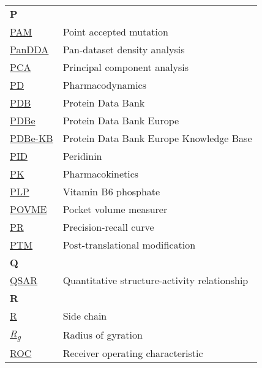 \begin{longtable}[l]{@{}p{2.5cm}p{12cm}@{}}
\textbf{\large P} & \\[0.25cm]
\textmd{\href{https://en.wikipedia.org/wiki/Point_accepted_mutation}{PAM}} & Point accepted mutation \\
\textmd{\href{https://www.nature.com/articles/ncomms15123}{PanDDA}} & Pan-dataset density analysis \\
\textmd{\href{https://en.wikipedia.org/wiki/Principal_component_analysis}{PCA}} & Principal component analysis \\
\textmd{\href{https://en.wikipedia.org/wiki/Pharmacodynamics}{PD}} & Pharmacodynamics \\ 
\textmd{\href{https://en.wikipedia.org/wiki/Protein_Data_Bank}{PDB}} & Protein Data Bank \\
\textmd{\href{https://www.ebi.ac.uk/pdbe/}{PDBe}} & Protein Data Bank Europe \\
\textmd{\href{https://www.ebi.ac.uk/pdbe/pdbe-kb/}{PDBe-KB}} & Protein Data Bank Europe Knowledge Base \\
\textmd{\href{https://www.ebi.ac.uk/pdbe-srv/pdbechem/chemicalCompound/show/PID}{PID}} & Peridinin \\
\textmd{\href{https://en.wikipedia.org/wiki/Pharmacokinetics}{PK}} & Pharmacokinetics \\
\textmd{\href{https://www.ebi.ac.uk/pdbe-srv/pdbechem/chemicalCompound/show/PLP}{PLP}} & Vitamin B6 phosphate \\
\textmd{\href{https://durrantlab.pitt.edu/povme2/}{POVME}} & Pocket volume measurer \\
\textmd{\href{https://en.wikipedia.org/wiki/Precision_and_recall}{PR}} & Precision-recall curve \\
\textmd{\href{https://en.wikipedia.org/wiki/Post-translational_modification}{PTM}} & Post-translational modification \\[0.3175cm]
\textbf{\large Q} & \\[0.25cm]
\textmd{\href{https://en.wikipedia.org/wiki/Quantitative_structure–activity_relationship}{QSAR}} & Quantitative structure-activity relationship \\[0.3175cm]
\newpage
\textbf{\large R} & \\[0.25cm]
\textmd{\href{https://en.wikipedia.org/wiki/Amino_acid\#Side_chains}{R}} & Side chain \\
\textmd{\href{https://en.wikipedia.org/wiki/Radius_of_gyration}{\textit{R\textsubscript{g}}}} & Radius of gyration \\
\textmd{\href{https://en.wikipedia.org/wiki/Receiver_operating_characteristic}{ROC}} & Receiver operating characteristic \\

\end{longtable}
